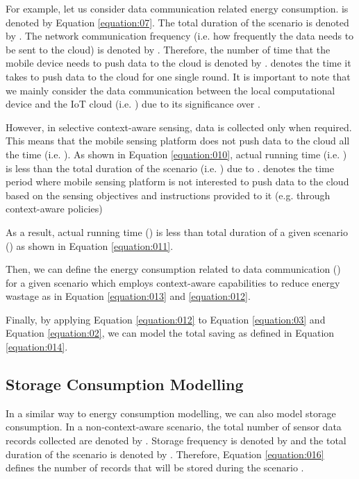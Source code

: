 \documentclass[journal]{IEEEtran}
\begin{document}
For example, let us consider data communication related  energy consumption.  is denoted by Equation \ref{equation:07}. The total duration of the scenario is denoted by . The network communication frequency (i.e. how frequently the data needs to be sent to the cloud) is denoted by . Therefore, the number of time that the mobile device needs to push data to the cloud is denoted by .  denotes the time it takes to push data to the cloud for one single round. It is important to  note that we mainly consider the data communication between the local computational device and the IoT cloud (i.e. ) due to its significance over .







However, in selective context-aware sensing, data is collected only when required. This means that the mobile sensing platform does not push data to the cloud all the time (i.e. ). As shown in Equation \ref{equation:010}, actual running time (i.e. ) is less than the total duration of the scenario (i.e. ) due to \Pi. \Pi denotes the time period where mobile sensing platform is not interested to push data to the cloud based on the sensing objectives and instructions provided to it (e.g. through context-aware policies) 




As a result, actual running time () is less than total duration of a given scenario () as shown in Equation \ref{equation:011}.




Then, we can define the energy consumption related to data communication ()  for a given scenario  which employs context-aware capabilities to reduce energy wastage as in Equation \ref{equation:013} and \ref{equation:012}.








Finally, by applying Equation \ref{equation:012} to Equation \ref{equation:03} and Equation \ref{equation:02}, we can model the total saving as defined in Equation \ref{equation:014}.





\subsection{Storage Consumption Modelling}
\label{sec:Storage}

In a similar  way to energy consumption modelling, we can also model storage consumption. In a non-context-aware  scenario, the total number of sensor data records collected are denoted by . Storage frequency is denoted by  and the total duration of the scenario   is denoted by . Therefore, Equation \ref{equation:016} defines the number of records that will be stored during the scenario .
\end{document}
